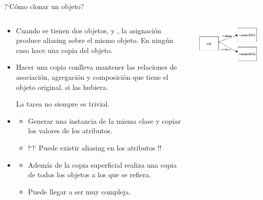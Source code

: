 \documentclass[10pt,envcountsect,spanish]{beamer}
\begin{document}
\begin{frame}{?`Cómo clonar un objeto?} 

\begin{columns}
\begin{column}{.6\textwidth}
\begin{itemize}
\item Cuando se tienen dos objetos,  y , la asignación  produce aliasing sobre el mismo objeto. En ningún caso hace una copia del objeto.

\item Hacer una copia conlleva mantener las relaciones de asociación, agregación y composición que tiene el objeto original, si las hubiera.

La tarea no siempre es trivial.

\item {}

\begin{itemize}
\item Generar una instancia de la misma clase y copiar los valores de los atributos.
\item !`!` Puede existir aliasing en los atributos !!
\end{itemize}

\item {}


\begin{itemize}
\item Además de la copia superficial realiza una copia de todos los objetos a los que se refiera.
\item Puede llegar a ser muy compleja.
\end{itemize}


\end{itemize}

\end{column}


\begin{column}{.3\textwidth}

\centerline{\includegraphics[height=.2\textheight]{fig/obj1}}


\end{column}
\end{columns}
\end{frame}
\end{document}
